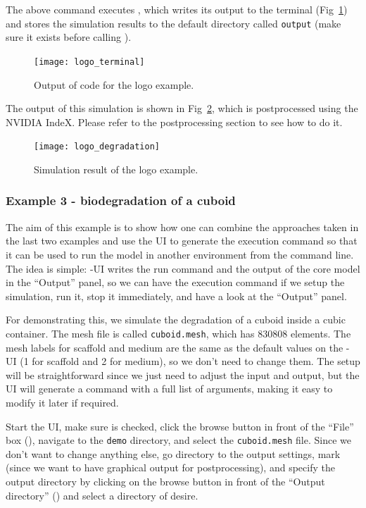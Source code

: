 The above command executes \biodeg{}, which writes its output to the terminal (Fig~\ref{fig:logo_terminal}) and stores the simulation results to the default directory called \verb|output| (make sure it exists before calling \biodeg{}). 

\begin{figure}[h]
\center \texttt{[image: logo\_terminal]}
\caption{Output of \biodeg{} code for the logo example.} \label{fig:logo_terminal}
\end{figure}

The output of this simulation is shown in Fig~\ref{fig:logo_degradation}, which is postprocessed using the NVIDIA IndeX. Please refer to the postprocessing section to see how to do it.

\begin{figure}[h]
\center \texttt{[image: logo\_degradation]}
\caption{Simulation result of the logo example.} \label{fig:logo_degradation}
\end{figure}

\subsubsection{Example 3 - biodegradation of a cuboid}\label{sec:example3}

The aim of this example is to show how one can combine the approaches taken in the last two examples and use the UI to generate the execution command so that it can be used to run the model in another environment from the command line. The idea is simple: \biodeg{}-UI writes the run command and the output of the core model in the ``Output'' panel, so we can have the execution command if we setup the simulation, run it, stop it immediately, and have a look at the ``Output'' panel.

For demonstrating this, we simulate the degradation of a cuboid inside a cubic container. The mesh file is called \verb|cuboid.mesh|, which has $\num{830808}$ elements. The mesh labels for scaffold and medium are the same as the default values on the \biodeg{}-UI (1 for scaffold and 2 for medium), so we don't need to change them. The setup will be straightforward since we just need to adjust the input and output, but the UI will generate a command with a full list of arguments, making it easy to modify it later if required.

Start the UI,
make sure  is checked, click the browse button in front of the ``File'' box (), navigate to the \verb|demo| directory, and select the \verb|cuboid.mesh| file. Since we don't want to change anything else, go directory to the output settings, mark
  (since we want to have graphical output for postprocessing), and specify the output directory by clicking on the browse button in front of the ``Output directory'' () and select a directory of desire. 
 
